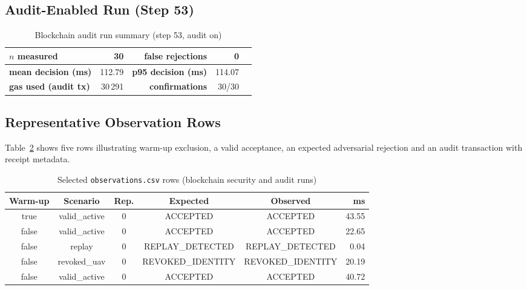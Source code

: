 \subsection{Audit-Enabled Run (Step 53)}
\label{app:raw-audit}

\begin{table}[htbp]
    \centering
    \caption{Blockchain audit run summary (step 53, audit on)}
    \label{tab:app-raw-audit}
    \small
    \begin{tabular}{|l|r|r|r|r|}
        \hline
        \textbf{$n$ measured} & 30 & \textbf{false rejections} & 0 \\
        \hline
        \textbf{mean decision (ms)} & 112.79 & \textbf{p95 decision (ms)} & 114.07 \\
        \hline
        \textbf{gas used (audit tx)} & 30\,291 & \textbf{confirmations} & 30/30 \\
        \hline
    \end{tabular}
\end{table}

\subsection{Representative Observation Rows}
\label{app:raw-observations}

Table~\ref{tab:app-obs-sample} shows five rows illustrating warm-up exclusion, a valid acceptance, an expected adversarial rejection and an audit transaction with receipt metadata.

\begin{table}[htbp]
    \centering
    \caption{Selected \texttt{observations.csv} rows (blockchain security and audit runs)}
    \label{tab:app-obs-sample}
    \scriptsize
    \begin{tabular}{|c|c|c|c|c|r|}
        \hline
        \textbf{Warm-up} & \textbf{Scenario} & \textbf{Rep.} & \textbf{Expected} & \textbf{Observed} & \textbf{ms} \\
        \hline
        true & valid\_active & 0 & ACCEPTED & ACCEPTED & 43.55 \\
        \hline
        false & valid\_active & 0 & ACCEPTED & ACCEPTED & 22.65 \\
        \hline
        false & replay & 0 & REPLAY\_DETECTED & REPLAY\_DETECTED & 0.04 \\
        \hline
        false & revoked\_uav & 0 & REVOKED\_IDENTITY & REVOKED\_IDENTITY & 20.19 \\
        \hline
        false & valid\_active & 0 & ACCEPTED & ACCEPTED & 40.72 \\
        \hline
    \end{tabular}
\end{table}

